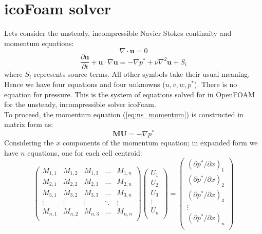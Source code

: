 \documentclass[a4paper,11pt]{report}
\begin{document}
\section{icoFoam solver} \label{sec:icoFoam_solver}
Lets consider the unsteady, incompressible Navier Stokes continuity and momentum equations:
\begin{equation}
    \nabla\cdot\mathbf{u} = 0
    \label{eq:continuity}
\end{equation}
\begin{equation}
    \frac{\partial\mathbf{u}}{\partial{t}} + \mathbf{u}\cdot\nabla\mathbf{u} = -\nabla{p^*} + \nu\nabla^{2}\mathbf{u} + S_i
    \label{eq:ns_momentum}
\end{equation}
where $S_i$ represents source terms. All other symbols take their usual meaning. Hence we have four equations and four unknowns ($u, v, w, p^*$). There is no equation for pressure. This is the system of equations solved for in OpenFOAM for the unsteady, incompressible solver icoFoam.
\vspace{5mm}\\
To proceed, the momentum equation (\ref{eq:ns_momentum}) is constructed in matrix form as:
\begin{equation}
    \mathbf{M}\mathbf{U} = -\nabla{p^*}
    \label{eq:ns_momentum_matrixform}
\end{equation}
Considering the $x$ components of the momentum equation; in expanded form we have $n$ equations, one for each cell centroid:
\begin{equation}
    \begin{pmatrix}
        M_{1,1} & M_{1,2} & M_{1,3} & \dots & M_{1,n}\\
        M_{2,1} & M_{2,2} & M_{2,3} & \dots & M_{2,n}\\
        M_{3,1} & M_{3,2} & M_{3,3} & \dots & M_{3,n}\\
        \vdots  & \vdots  & \vdots  & \ddots & \vdots\\
        M_{n,1} & M_{n,2} & M_{n,3} & \dots & M_{n,n}\\
    \end{pmatrix}
    \begin{pmatrix}
        U_{1}\\
        U_{2}\\
        U_{3}\\
        \vdots\\
        U_{n}\\
    \end{pmatrix} =
    \begin{pmatrix}
        (\partial{p^*}/\partial{x})_1\\
        (\partial{p^*}/\partial{x})_2\\
        (\partial{p^*}/\partial{x})_3\\
        \vdots\\
        (\partial{p^*}/\partial{x})_n\\
    \end{pmatrix}
    \label{eq:ns_momentum_matrixform_ex}
\end{equation}
\end{document}
